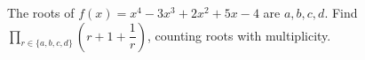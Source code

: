 The roots of $f(x)=x^4-3x^3+2x^2+5x-4$ are $a,b,c,d$. Find $\prod_{r\in\{a,b,c,d\}}(r+1+\dfrac{1}{r})$, counting roots with multiplicity.
